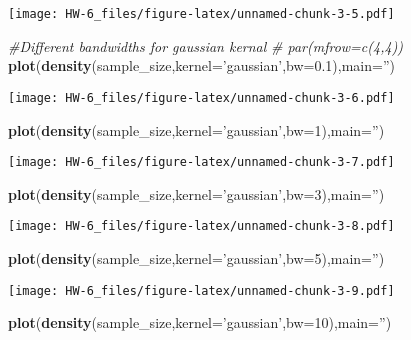 \documentclass[]{article}
\newenvironment{Shaded}{\begin{snugshade}}{\end{snugshade}}
\newcommand{\CommentTok}[1]{\textcolor[rgb]{0.56,0.35,0.01}{\textit{#1}}}
\newcommand{\DataTypeTok}[1]{\textcolor[rgb]{0.13,0.29,0.53}{#1}}
\newcommand{\DecValTok}[1]{\textcolor[rgb]{0.00,0.00,0.81}{#1}}
\newcommand{\FloatTok}[1]{\textcolor[rgb]{0.00,0.00,0.81}{#1}}
\newcommand{\KeywordTok}[1]{\textcolor[rgb]{0.13,0.29,0.53}{\textbf{#1}}}
\newcommand{\NormalTok}[1]{#1}
\newcommand{\StringTok}[1]{\textcolor[rgb]{0.31,0.60,0.02}{#1}}
\begin{document}
\texttt{[image: HW-6\_files/figure-latex/unnamed-chunk-3-5.pdf]}

\begin{Shaded}
\begin{Highlighting}[]
\CommentTok{#Different bandwidths for gaussian kernal}
\CommentTok{# par(mfrow=c(4,4))}
\KeywordTok{plot}\NormalTok{(}\KeywordTok{density}\NormalTok{(sample_size,}\DataTypeTok{kernel=}\StringTok{'gaussian'}\NormalTok{,}\DataTypeTok{bw=}\FloatTok{0.1}\NormalTok{),}\DataTypeTok{main=}\StringTok{''}\NormalTok{)}
\end{Highlighting}
\end{Shaded}

\texttt{[image: HW-6\_files/figure-latex/unnamed-chunk-3-6.pdf]}

\begin{Shaded}
\begin{Highlighting}[]
\KeywordTok{plot}\NormalTok{(}\KeywordTok{density}\NormalTok{(sample_size,}\DataTypeTok{kernel=}\StringTok{'gaussian'}\NormalTok{,}\DataTypeTok{bw=}\DecValTok{1}\NormalTok{),}\DataTypeTok{main=}\StringTok{''}\NormalTok{)}
\end{Highlighting}
\end{Shaded}

\texttt{[image: HW-6\_files/figure-latex/unnamed-chunk-3-7.pdf]}

\begin{Shaded}
\begin{Highlighting}[]
\KeywordTok{plot}\NormalTok{(}\KeywordTok{density}\NormalTok{(sample_size,}\DataTypeTok{kernel=}\StringTok{'gaussian'}\NormalTok{,}\DataTypeTok{bw=}\DecValTok{3}\NormalTok{),}\DataTypeTok{main=}\StringTok{''}\NormalTok{)}
\end{Highlighting}
\end{Shaded}

\texttt{[image: HW-6\_files/figure-latex/unnamed-chunk-3-8.pdf]}

\begin{Shaded}
\begin{Highlighting}[]
\KeywordTok{plot}\NormalTok{(}\KeywordTok{density}\NormalTok{(sample_size,}\DataTypeTok{kernel=}\StringTok{'gaussian'}\NormalTok{,}\DataTypeTok{bw=}\DecValTok{5}\NormalTok{),}\DataTypeTok{main=}\StringTok{''}\NormalTok{)}
\end{Highlighting}
\end{Shaded}

\texttt{[image: HW-6\_files/figure-latex/unnamed-chunk-3-9.pdf]}

\begin{Shaded}
\begin{Highlighting}[]
\KeywordTok{plot}\NormalTok{(}\KeywordTok{density}\NormalTok{(sample_size,}\DataTypeTok{kernel=}\StringTok{'gaussian'}\NormalTok{,}\DataTypeTok{bw=}\DecValTok{10}\NormalTok{),}\DataTypeTok{main=}\StringTok{''}\NormalTok{)}
\end{Highlighting}
\end{Shaded}
\end{document}

